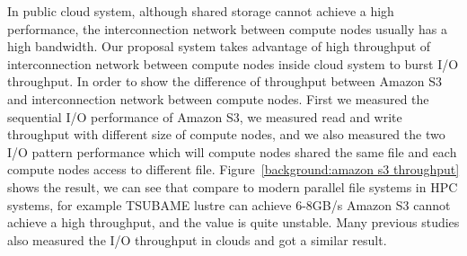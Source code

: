 In public cloud system, although shared storage cannot achieve a high performance, the
interconnection network between compute nodes usually has a high bandwidth.
Our proposal system takes advantage of high throughput of interconnection network between compute
nodes inside cloud system to burst I/O throughput.
In order to show the difference of throughput between Amazon S3 and interconnection network between
compute nodes.
First we measured the sequential I/O performance of Amazon S3, we measured read and write throughput
with different size of compute nodes, and we also measured the two I/O pattern performance which
will compute nodes shared the same file and each compute nodes access to different file.
Figure~\ref{background:amazon s3 throughput} shows the result, we can see that compare to modern parallel file systems in HPC systems, for example TSUBAME lustre can achieve 6-8GB/s\cite{checkpointing}
 Amazon S3 cannot achieve a high throughput, and the value is
quite unstable.
Many previous studies also measured the I/O throughput in clouds
\cite{Chiba,Transactions_a_la_carte, Interactive_Use_of_Cloud_Services,Amazon_S3_for_Science_Grids,
anevaluation} and got a similar result.
 
